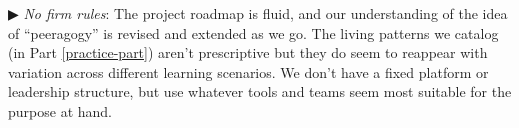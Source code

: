 \begin{mdframed}
▶ \emph{No firm rules}: The project roadmap is fluid, and our
understanding of the idea of ``peeragogy'' is revised and extended as
we go.  The living patterns we catalog (in Part \ref{practice-part})
aren't prescriptive but they do seem to reappear with variation across
different learning scenarios.  We don't have a fixed platform or
leadership structure, but use whatever tools and teams seem most
suitable for the purpose at hand.
\end{mdframed}
